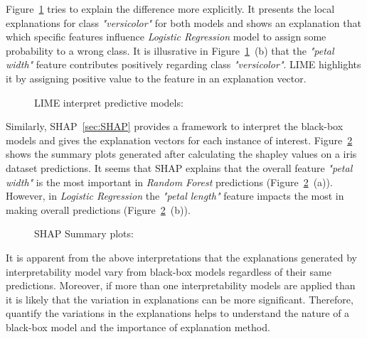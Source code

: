 \documentclass[english]{tktltiki2}
\theoremstyle{definition}
\theoremstyle{remark}
\begin{document}
Figure~\ref{fig:lime_iris_instance_interpretations} tries to explain the difference more explicitly. It presents the local explanations for class \textit{"versicolor"}
for both models and shows an explanation that which specific features influence \textit{Logistic Regression} model to assign some probability to a wrong class. It is illusrative in Figure~\ref{fig:lime_iris_instance_interpretations}~(b) that the \textit{"petal width"} feature contributes positively regarding class \textit{"versicolor"}. LIME highlights it by assigning positive value to the feature in an explanation vector.
\begin{figure}[H]
	\vspace*{0mm}
	\centering
	\label{subfig:lime_rf_iris_instance_interpretations}
	\qquad
	\label{subfig:lime_lr_iris_instance_interpretations}
	\caption{LIME interpret predictive models:}%
	\label{fig:lime_iris_instance_interpretations}%
\end{figure}


Similarly, SHAP~\ref{sec:SHAP} provides a framework to interpret the black-box models and gives the explanation vectors for each instance of interest. Figure~\ref{fig:shap_iris_summary_plots} shows the summary plots generated after calculating the shapley values on a iris dataset predictions. It seems that SHAP explains that the overall feature \textit{"petal width"} is the most important in \textit{Random Forest} predictions (Figure~\ref{fig:shap_iris_summary_plots}~(a)). However, in \textit{Logistic Regression} the \textit{"petal length"} feature impacts the most in making overall predictions (Figure~\ref{fig:shap_iris_summary_plots}~(b)). 
\begin{figure}[H]
	\vspace*{0mm}
	\centering
	\qquad
	\caption{SHAP Summary plots:}%
	\label{fig:shap_iris_summary_plots}%
\end{figure}

It is apparent from the above interpretations that the explanations generated by interpretability model vary from black-box models regardless of their same predictions. Moreover, if more than one interpretability models are applied than it is likely that the variation in explanations can be more significant. Therefore, quantify the variations in the explanations helps to understand the nature of a black-box model and the importance of explanation method.
\end{document}
